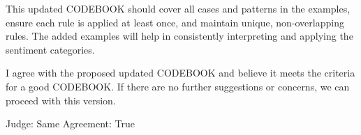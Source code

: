 This updated CODEBOOK should cover all cases and patterns in the
examples, ensure each rule is applied at least once, and maintain
unique, non-overlapping rules. The added examples will help in
consistently interpreting and applying the sentiment categories.

I agree with the proposed updated CODEBOOK and believe it meets the
criteria for a good CODEBOOK. If there are no further suggestions or
concerns, we can proceed with this version.

Judge: Same Agreement: True